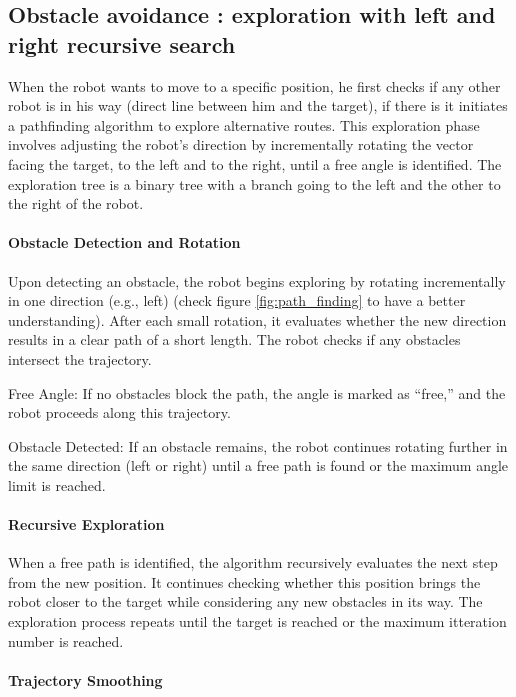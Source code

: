 \subsection{Obstacle avoidance : exploration with left and right recursive search}

When the robot wants to move to a specific position, he first checks if any other robot is in his way (direct line between him and the target), if there is it initiates a pathfinding algorithm to explore alternative routes. This exploration phase involves adjusting the robot’s direction by incrementally rotating the vector facing the target, to the left and to the right, until a free angle is identified. The exploration tree is a binary tree with a branch going to the left and the other to the right of the robot.

\paragraph{Obstacle Detection and Rotation}

Upon detecting an obstacle, the robot begins exploring by rotating incrementally in one direction (e.g., left) (check figure \ref{fig:path_finding} to have a better understanding). After each small rotation, it evaluates whether the new direction results in a clear path of a short length. The robot checks if any obstacles intersect the trajectory.

Free Angle: If no obstacles block the path, the angle is marked as “free,” and the robot proceeds along this trajectory.

Obstacle Detected: If an obstacle remains, the robot continues rotating further in the same direction (left or right) until a free path is found or the maximum angle limit is reached.

\paragraph{Recursive Exploration}

When a free path is identified, the algorithm recursively evaluates the next step from the new position. It continues checking whether this position brings the robot closer to the target while considering any new obstacles in its way. The exploration process repeats until the target is reached or the maximum itteration number is reached.

\paragraph{Trajectory Smoothing}

